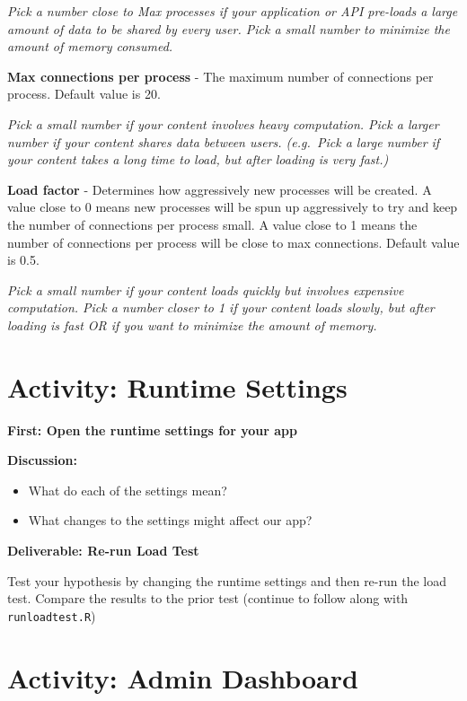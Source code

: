 \documentclass[]{book}
\providecommand{\tightlist}{%
  \setlength{\itemsep}{0pt}\setlength{\parskip}{0pt}}
\theoremstyle{definition}
\theoremstyle{definition}
\theoremstyle{definition}
\theoremstyle{remark}
\begin{document}
\emph{Pick a number close to Max processes if your application or API
pre-loads a large amount of data to be shared by every user. Pick a
small number to minimize the amount of memory consumed.}

\textbf{Max connections per process} - The maximum number of connections
per process. Default value is 20.

\emph{Pick a small number if your content involves heavy computation.
Pick a larger number if your content shares data between users.
(e.g.~Pick a large number if your content takes a long time to load, but
after loading is very fast.)}

\textbf{Load factor} - Determines how aggressively new processes will be
created. A value close to 0 means new processes will be spun up
aggressively to try and keep the number of connections per process
small. A value close to 1 means the number of connections per process
will be close to max connections. Default value is 0.5.

\emph{Pick a small number if your content loads quickly but involves
expensive computation. Pick a number closer to 1 if your content loads
slowly, but after loading is fast OR if you want to minimize the amount
of memory.}

\hypertarget{activity-runtime-settings}{%
\section{Activity: Runtime Settings}\label{activity-runtime-settings}}

\textbf{First: Open the runtime settings for your app}

\textbf{Discussion:}

\begin{itemize}
\tightlist
\item
  What do each of the settings mean?
\item
  What changes to the settings might affect our app?
\end{itemize}

\textbf{Deliverable: Re-run Load Test}

Test your hypothesis by changing the runtime settings and then re-run
the load test. Compare the results to the prior test (continue to follow
along with \texttt{runloadtest.R})

\hypertarget{activity-admin-dashboard}{%
\section{Activity: Admin Dashboard}\label{activity-admin-dashboard}}
\end{document}
